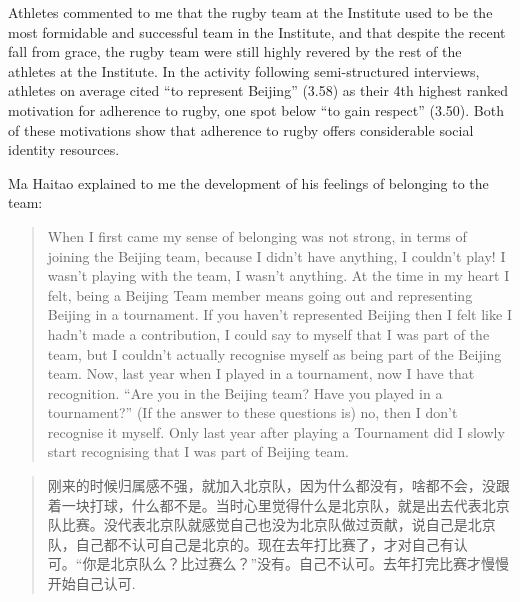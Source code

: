\begin{CJK}{UTF8}{gbsn}
Athletes commented to me that the rugby team at the Institute used to be the most formidable and successful team in the Institute, and that despite the recent fall from grace, the rugby team were still highly revered by the rest of the athletes at the Institute.  In the activity following semi-structured interviews, athletes on average cited ``to represent Beijing'' (3.58) as their 4th highest ranked motivation for adherence to rugby, one spot below ``to gain respect'' (3.50).  Both of these motivations show that adherence to rugby offers considerable social identity resources.


Ma Haitao explained to me the development of his feelings of belonging to the team:

  \begin{quote}
    When I first came my sense of belonging was not strong, in terms of joining the Beijing team, because I didn’t have anything, I couldn’t play! I wasn’t playing with the team, I wasn’t anything.  At the time in my heart I felt, being a Beijing Team member means going out and representing Beijing in a tournament.  If you haven’t represented Beijing then I felt like I hadn’t made a contribution, I could say to myself that I was part of the team, but I couldn’t actually recognise myself as being part of the Beijing team.  Now, last year when I played in a tournament, now I have that recognition. ``Are you in the Beijing team? Have you played in a tournament?'' (If the answer to these questions is) no, then I don’t recognise it myself.  Only last year after playing a Tournament did I slowly start recognising that I was part of Beijing team.
  \end{quote}

  \begin{quote}
    刚来的时候归属感不强，就加入北京队，因为什么都没有，啥都不会，没跟着一块打球，什么都不是。当时心里觉得什么是北京队，就是出去代表北京队比赛。没代表北京队就感觉自己也没为北京队做过贡献，说自己是北京队，自己都不认可自己是北京的。现在去年打比赛了，才对自己有认可。“你是北京队么？比过赛么？”没有。自己不认可。去年打完比赛才慢慢开始自己认可.
  \end{quote}


\end{CJK}
